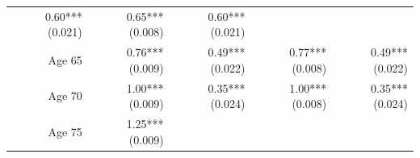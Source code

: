 \documentclass[]{article}
\begin{document}
\begin{longtable}[c]{@{}rrrrr@{}}
\begin{minipage}[t]{0.16\columnwidth}
0.60*** (0.021)
\strut\end{minipage} &
\begin{minipage}[t]{0.21\columnwidth}\raggedleft\strut
0.65*** (0.008)
\strut\end{minipage} &
\begin{minipage}[t]{0.15\columnwidth}\raggedleft\strut
0.60*** (0.021)
\strut\end{minipage}\tabularnewline
\begin{minipage}[t]{0.17\columnwidth}\raggedleft\strut
Age 65
\strut\end{minipage} &
\begin{minipage}[t]{0.18\columnwidth}\raggedleft\strut
0.76*** (0.009)
\strut\end{minipage} &
\begin{minipage}[t]{0.16\columnwidth}\raggedleft\strut
0.49*** (0.022)
\strut\end{minipage} &
\begin{minipage}[t]{0.21\columnwidth}\raggedleft\strut
0.77*** (0.008)
\strut\end{minipage} &
\begin{minipage}[t]{0.15\columnwidth}\raggedleft\strut
0.49*** (0.022)
\strut\end{minipage}\tabularnewline
\begin{minipage}[t]{0.17\columnwidth}\raggedleft\strut
Age 70
\strut\end{minipage} &
\begin{minipage}[t]{0.18\columnwidth}\raggedleft\strut
1.00*** (0.009)
\strut\end{minipage} &
\begin{minipage}[t]{0.16\columnwidth}\raggedleft\strut
0.35*** (0.024)
\strut\end{minipage} &
\begin{minipage}[t]{0.21\columnwidth}\raggedleft\strut
1.00*** (0.008)
\strut\end{minipage} &
\begin{minipage}[t]{0.15\columnwidth}\raggedleft\strut
0.35*** (0.024)
\strut\end{minipage}\tabularnewline
\begin{minipage}[t]{0.17\columnwidth}\raggedleft\strut
Age 75
\strut\end{minipage} &
\begin{minipage}[t]{0.18\columnwidth}\raggedleft\strut
1.25*** (0.009)
\strut\end{minipage} &
\begin{minipage}[t]{0.16\columnwidth}\raggedleft\strut

\end{minipage}
\end{longtable}
\end{document}
